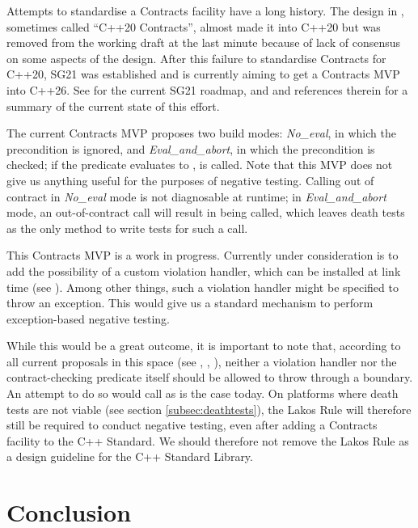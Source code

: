 Attempts to standardise a Contracts facility have a long history. The design in \cite{P0542R5}, sometimes called ``C++20 Contracts'', almost made it into C++20 but was removed from the working draft at the last minute because of lack of consensus on some aspects of the design. After this failure to standardise Contracts for C++20, SG21 was established and is currently aiming to get a Contracts MVP into C++26. See \cite{P2695R1} for the current SG21 roadmap, and \cite{P2521R3} and references therein for a summary of the current state of this effort.

The current Contracts MVP proposes two build modes: \emph{No_eval}, in which the precondition is ignored, and \emph{Eval_and_abort}, in which the precondition is checked; if the predicate evaluates to ,  is called. Note that this MVP does not give us anything useful for the purposes of negative testing. Calling  out of contract in \emph{No_eval} mode is not diagnosable at runtime; in \mbox{\emph{Eval_and_abort}} mode, an out-of-contract call will result in  being called, which leaves death tests as the only method to write tests for such a call.

This Contracts MVP is a work in progress. Currently under consideration is to add the possibility of a custom violation handler, which can be installed at link time (see \cite{P2811R3}). Among other things, such a violation handler might be specified to throw an exception. This would give us a standard mechanism to perform exception-based negative testing.

While this would be a great outcome, it is important to note that, according to all current proposals in this space (see \cite{P2698R0}, \cite{P2811R3}, \cite{P2834R0}), neither a violation handler nor the contract-checking predicate itself should be allowed to throw through a  boundary. An attempt to do so would call  as is the case today. On platforms where death tests are not viable (see section \ref{subsec:deathtests}), the Lakos Rule will therefore still be required to conduct negative testing, even after adding a Contracts facility to the C++ Standard. We should therefore not remove the Lakos Rule as a design guideline for the C++ Standard Library.

\section{Conclusion}

